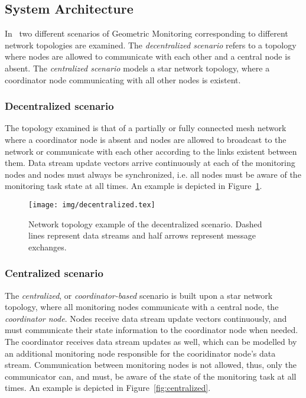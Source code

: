 \subsection{System Architecture} \label{subsec:theorBack-GM-sysArch}

In~\cite{Sharfman2006GM} two different scenarios of Geometric Monitoring corresponding to different network topologies are examined. The \emph{decentralized scenario} refers to a topology where nodes are allowed to communicate with each other and a central node is absent. The \emph{centralized scenario} models a star network topology, where a coordinator node communicating with all other nodes is existent.

\subsubsection{Decentralized scenario} \label{subsubsec:theorBack-GM-decentralized}

The topology examined is that of a partially or fully connected mesh network where a coordinator node is absent and nodes are allowed to broadcast to the network or communicate with each other according to the links existent between them. Data stream update vectors arrive continuously at each of the monitoring nodes and nodes must always be synchronized, i.e. all nodes must be aware of the monitoring task state at all times. An example is depicted in Figure~\ref{fig:decentralized}.

\begin{figure}[H]
\centering
\texttt{[image: img/decentralized.tex]}
\caption{Network topology example of the decentralized scenario. Dashed lines represent data streams and half arrows represent message exchanges.} 
\label{fig:decentralized}
\end{figure}

\subsubsection{Centralized scenario}

The \emph{centralized}, or \emph{coordinator-based} scenario is built upon a star network topology, where all monitoring nodes communicate with a central node, the \emph{coordinator node}. Nodes receive data stream update vectors continuously, and must communicate their state information to the coordinator node when needed. The coordinator receives data stream updates as well, which can be modelled by an additional monitoring node responsible for the cooridinator node's data stream. Communication between monitoring nodes is not allowed, thus, only the communicator can, and must, be aware of the state of the monitoring task at all times. An example is depicted in Figure~\ref{fig:centralized}.

